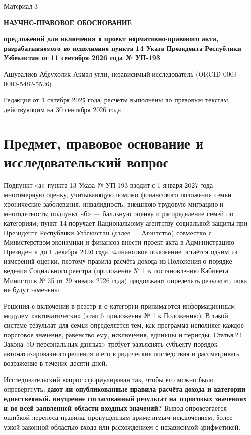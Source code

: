 \documentclass[12pt,a4paper]{extarticle}
\begin{document}
\begin{flushright}Материал 3\end{flushright}
\begin{center}
\textbf{НАУЧНО-ПРАВОВОЕ ОБОСНОВАНИЕ}\par
\textbf{предложений для включения в проект нормативно-правового акта, разрабатываемого во исполнение пункта 14 Указа Президента Республики Узбекистан от 11 сентября 2026 года № УП-193}\par
\medskip
Ашуралиев Абдухолик Акмал угли, независимый исследователь (ORCID 0009-0003-5482-5526)\par
Редакция от 1 октября 2026 года; расчёты выполнены по правовым текстам, действующим на 30 сентября 2026 года
\end{center}

\section{Предмет, правовое основание и исследовательский вопрос}
Подпункт «а» пункта 13 Указа № УП-193 вводит с 1 января 2027 года многомерную оценку, учитывающую помимо финансового положения семьи хронические заболевания, инвалидность, внешнюю трудовую миграцию и многодетность; подпункт «б» — балльную оценку и распределение семей по категориям; пункт 14 поручает Национальному агентству социальной защиты при Президенте Республики Узбекистан (далее — Агентство) совместно с Министерством экономики и финансов внести проект акта в Администрацию Президента до 1 декабря 2026 года\cite{ref1}. Финансовое положение остаётся одним из измерений оценки, поэтому правила расчёта дохода из Положения о порядке ведения Социального реестра (приложение № 1 к постановлению Кабинета Министров № 35 от 29 января 2026 года) продолжают определять результат, пока не будут заменены\cite{ref2}.

Решения о включении в реестр и о категории принимаются информационным модулем «автоматически» (этап 6 приложения № 1 к Положению)\cite{ref2}. В такой системе результат для семьи определяется тем, как программа исполняет каждое пороговое значение, равенство ему, исключения, единицы и периоды. Статья 24 Закона «О персональных данных» требует разъяснять субъекту порядок автоматизированного решения и его юридические последствия и рассматривать возражение в течение десяти дней\cite{ref9}.

Исследовательский вопрос сформулирован так, чтобы его можно было опровергнуть: \textbf{дают ли опубликованные правила расчёта дохода и категории единственный, внутренне согласованный результат на пороговых значениях и во всей заявленной области входных значений?} Вывод опровергается ошибкой переноса правила, пропущенным применимым исключением, более узкой законной областью входа или расхождением с независимой арифметикой.
\end{document}
